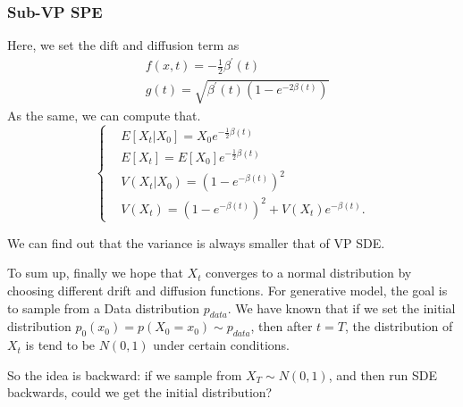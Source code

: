 \subsubsection*{Sub-VP SPE}
Here, we set the dift and diffusion term as
\begin{equation}
\begin{aligned}
        &f(x, t)=-\frac{1}{2} \beta^{\prime}(t) \\
        &g(t)=\sqrt{\beta^{\prime}(t)\left(1-e^{-2 \beta(t)}\right)}
\end{aligned}
\end{equation}
As the same, we can compute that.
\begin{equation}
    \left\{\begin{aligned}
    &E\left[X_{t} | X_{0}\right]=X_{0} e^{-\frac{1}{2} \beta(t)} \\
    &E\left[X_{t}\right]=E\left[X_{0}\right] e^{-\frac{1}{2} \beta(t)} \\
    &V\left(X_{t} | X_{0}\right)=\left(1-e^{-\beta(t)}\right)^{2} \\
    &V\left(X_{t}\right)=\left(1-e^{-\beta(t)}\right)^{2}+V\left(X_{t}\right) e^{-\beta(t)} .
    \end{aligned}\right.
\end{equation}

We can find out that the variance is always smaller that of VP SDE.

\begin{remark}
    To sum up, finally we hope that $X_t$ converges to a normal distribution by choosing different drift and diffusion functions. 
    For generative model, the goal is to sample from a Data distribution $p_{data}$. We have known that if we set the initial distribution $p_0(x_0)=p(X_0=x_0)\sim p_{data}$, 
    then after $t=T$, the distribution of $X_t$ is tend to be $N(0, 1)$ under certain conditions. 
    
    So the idea is backward: if we sample from $X_T\sim N(0, 1)$, and then run SDE backwards, could we get the initial distribution?
\end{remark}

